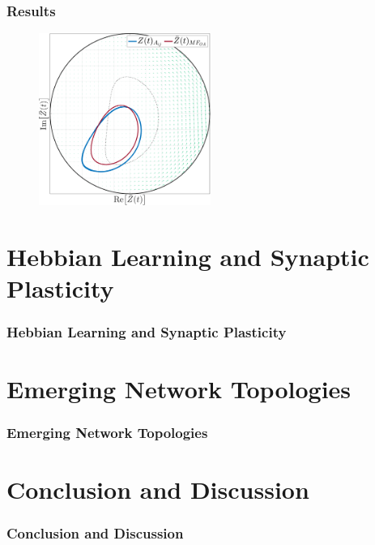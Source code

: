 \begin{frame}
\frametitle{Results} 
\begin{figure}[H]
\centering
\includegraphics[width = 0.5\textwidth]{../Figures/PhaseSpace/ScalefreeLimCycles.pdf}
\label{fig:InspectMeanFieldScaleFreePhaseSpace}
\end{figure}
\end{frame}



\section{Hebbian Learning and Synaptic Plasticity} 
\begin{frame}
\frametitle{Hebbian Learning and Synaptic Plasticity}
\end{frame}


\section{\mywork Emerging Network Topologies} 
\begin{frame}
\frametitle{\mywork Emerging Network Topologies}
\end{frame}


\section{Conclusion and Discussion} 
\begin{frame}
\frametitle{Conclusion and Discussion}
\end{frame}
